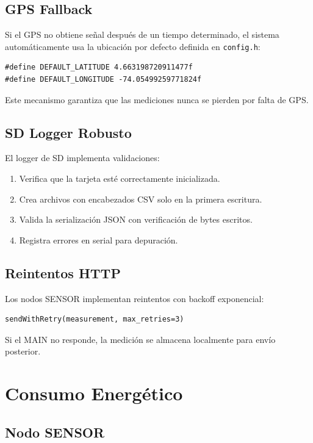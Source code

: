 \documentclass[journal]{IEEEtran}
\begin{document}
\subsection{GPS Fallback}

Si el GPS no obtiene señal después de un tiempo determinado, el sistema automáticamente usa la ubicación por defecto definida en \texttt{config.h}:

\begin{lstlisting}
#define DEFAULT_LATITUDE 4.663198720911477f
#define DEFAULT_LONGITUDE -74.05499259771824f
\end{lstlisting}

Este mecanismo garantiza que las mediciones nunca se pierden por falta de GPS.

\subsection{SD Logger Robusto}

El logger de SD implementa validaciones:

\begin{enumerate}
\item Verifica que la tarjeta esté correctamente inicializada.
\item Crea archivos con encabezados CSV solo en la primera escritura.
\item Valida la serialización JSON con verificación de bytes escritos.
\item Registra errores en serial para depuración.
\end{enumerate}

\subsection{Reintentos HTTP}

Los nodos SENSOR implementan reintentos con backoff exponencial:

\begin{lstlisting}
sendWithRetry(measurement, max_retries=3)
\end{lstlisting}

Si el MAIN no responde, la medición se almacena localmente para envío posterior.

\section{Consumo Energético}

\subsection{Nodo SENSOR}
\end{document}
